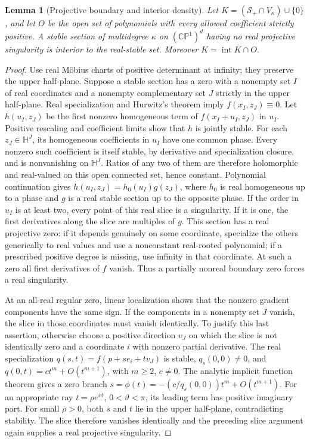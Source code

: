 \documentclass[reqno]{amsart}
\newtheorem{lemma}[theorem]{Lemma}
\theoremstyle{definition}
\theoremstyle{remark}
\newcommand{\HH}{\mathbb H}
\begin{document}
\begin{lemma}[Projective boundary and interior density]\label{pos:boundary}
Let \(K=(\mathcal S_+\cap V_\kappa)\cup\{0\}\), and let \(O\) be the open set
of polynomials with every allowed coefficient strictly positive.
A stable section of multidegree \(\kappa\) on \((\mathbb{CP}^1)^d\) having no
real projective singularity is interior to the real-stable set.
Moreover \(K=\overline{\operatorname{int}K\cap O}\).
\end{lemma}
\begin{proof}
Use real M\"obius charts of positive determinant at infinity; they preserve the
upper half-plane.  Suppose a stable section has a zero with a nonempty set \(I\)
of real coordinates and a nonempty complementary set \(J\) strictly in the upper
half-plane.  Real specialization and Hurwitz's theorem imply
\(f(x_I,z_J)\equiv0\).
Let \(h(u_I,z_J)\) be the first nonzero homogeneous term of
\(f(x_I+u_I,z_J)\) in \(u_I\).  Positive rescaling and coefficient limits show
that \(h\) is jointly stable.  For each \(z_J\in\HH^J\), its homogeneous
coefficients in \(u_I\) have one common phase.  Every nonzero such coefficient
is itself stable, by derivative and specialization closure, and is nonvanishing
on \(\HH^J\).  Ratios of any two of them are therefore holomorphic and real-valued
on this open connected set, hence constant.  Polynomial continuation gives
\(h(u_I,z_J)=h_0(u_I)g(z_J)\), where \(h_0\) is real homogeneous up to a phase
and \(g\) is a real stable section up to the opposite phase.
If the order in \(u_I\) is at least two, every point of this real slice is a
singularity.  If it is one, the first derivatives along the slice are multiples
of \(g\).  This section has a real projective zero: if it depends genuinely on
some coordinate, specialize the others generically to real values and use a
nonconstant real-rooted polynomial; if a prescribed positive degree is missing,
use infinity in that coordinate.  At such a zero all first derivatives of \(f\)
vanish.  Thus a partially nonreal boundary zero forces a real singularity.

At an all-real regular zero, linear localization shows that the nonzero gradient
components have the same sign.  If the components in a nonempty set \(J\) vanish,
the slice in those coordinates must vanish identically.  To justify this last
assertion, otherwise choose a positive direction \(v_J\) on which the slice is
not identically zero and a coordinate \(i\) with nonzero partial derivative.
The real specialization
\(q(s,t)=f(p+s e_i+t v_J)\) is stable,
\(q_s(0,0)\ne0\), and \(q(0,t)=ct^m+O(t^{m+1})\), with \(m\ge2\), \(c\ne0\).
The analytic implicit function theorem gives a zero branch
\(s=\phi(t)=-(c/q_s(0,0))t^m+O(t^{m+1})\).
For an appropriate ray \(t=\rho e^{i\vartheta}\), \(0<\vartheta<\pi\),
its leading term has positive imaginary part.  For small \(\rho>0\), both
\(s\) and \(t\) lie in the upper half-plane, contradicting stability.
The slice therefore vanishes identically and the preceding slice argument
again supplies a real projective singularity.


\end{proof}
\end{document}

